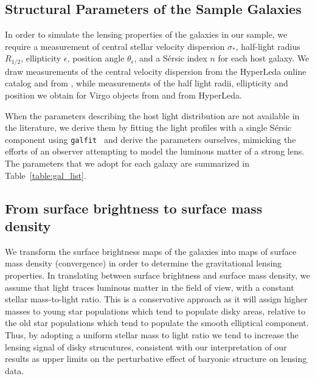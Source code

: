 \subsection{Structural Parameters of the Sample Galaxies}
\label{sect:lenses}

In order to simulate the lensing properties of the galaxies in our sample, we require a measurement of central stellar velocity dispersion $\sigma_*$, half-light radius $R_{1/2}$, ellipticity $\epsilon$, position angle $\theta_{\epsilon}$, and a S{\'e}rsic index $n$ for each host galaxy. We draw measurements of the central velocity dispersion from the HyperLeda online catalog \cite{Makarov++2014} and from \cite{Ma++2014}, while measurements of the half light radii, ellipticity and position we obtain for Virgo objects from \cite{Fer++06b} and from HyperLeda.

When the parameters describing the host light distribution are not available in the literature, we derive them by fitting the light profiles with a single S{\'e}rsic component using {\tt {galfit} }  \cite{Peng:2002p217} and derive the parameters ourselves, mimicking the efforts of an observer attempting to model the luminous matter of a strong lens. The parameters that we adopt for each galaxy are summarized in 
Table~\ref{table:gal_list}.

\subsection{From surface brightness to surface mass density}
\label{ssec:tomass}

We transform the surface brightness maps of the galaxies into maps of surface mass density (convergence) in order to determine the gravitational lensing properties. In translating between surface brightness and surface mass density, we assume that light traces luminous matter in the field of view, with a constant stellar mass-to-light ratio. This is a conservative approach as it will assign higher masses to young star populations which tend to populate disky areas, relative to the old star populations which tend to populate the smooth elliptical component. Thus, by adopting a uniform stellar mass to light ratio we tend to increase the lensing signal of disky strucutures, consistent with our interpretation of our results as upper limits on the perturbative effect of baryonic structure on lensing data. 

